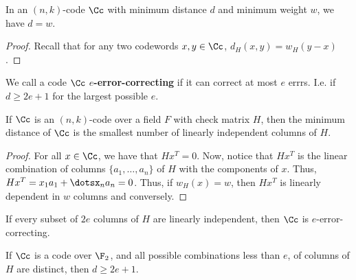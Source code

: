 \begin{lemma}\label{2.3.3}
    In an $(n,k)$-code $\Cc$ with minimum distance $d$ and minimum weight $w$,
    we have $d=w$.
\end{lemma}
\begin{proof}
    Recall that for any two codewords $x,y \in \Cc$,  $d_H(x,y)=w_H(y-x)$.
\end{proof}

\begin{definition}
    We call a code $\Cc$ \textbf{$e$-error-correcting} if it can correct at most
    $e$ errrs. I.e. if  $d \geq 2e+1$ for the largest possible $e$.
\end{definition}

\begin{theorem}\label{2.3.4}
    If $\Cc$ is an  $(n,k)$-code over a field $F$ with check matrix  $H$, then
    the minimum distance of  $\Cc$ is the smallest number of linearly
    independent columns of  $H$.
\end{theorem}
\begin{proof}
    For all $x \in \Cc$, we have that  $Hx^T=0$. Now, notice that  $Hx^T$ is the
    linear combination of columns $\{a_1, \dots, a_n\}$ of $H$ with the
    components of $x$. Thus, $Hx^T=x_1a_1+\dotsx_na_n=0$. Thus, if $w_H(x)=w$,
    then $Hx^T$ is linearly dependent in $w$ columns and conversely.
\end{proof}
\begin{corollary}
    If every subset of $2e$ columns of  $H$ are linearly independent, then
    $\Cc$ is $e$-error-correcting.
\end{corollary}
\begin{corollary}
    If $\Cc$ is a code over  $\F_2$, and all possible combinations less than
    $e$, of columns of  $H$ are distinct, then $d \geq 2e+1$.
\end{corollary}
